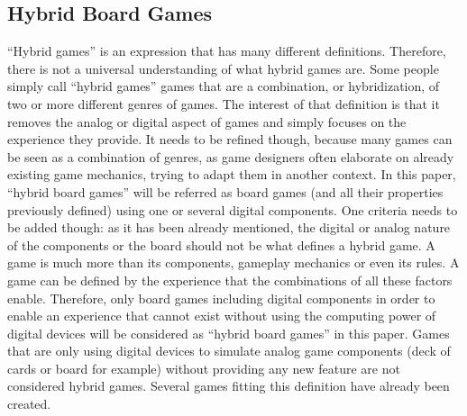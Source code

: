 \subsection{Hybrid Board Games}
“Hybrid games” is an expression that has many different definitions. Therefore, there is not a universal understanding of what hybrid games are. Some people simply call “hybrid games” games that are a combination, or hybridization, of two or more different genres of games. The interest of that definition is that it removes the analog or digital aspect of games and simply focuses on the experience they provide. It needs to be refined though, because many games can be seen as a combination of genres, as game designers often elaborate on already existing game mechanics, trying to adapt them in another context. In this paper, “hybrid board games” will be referred as board games (and all their properties previously defined) using one or several digital components. One criteria needs to be added though: as it has been already mentioned, the digital or analog nature of the components or the board should not be what defines a hybrid game. A game is much more than its components, gameplay mechanics or even its rules. A game can be defined by the experience that the combinations of all these factors enable. Therefore, only board games including digital components in order to enable an experience that cannot exist without using the computing power of digital devices will be considered as “hybrid board games” in this paper. Games that are only using digital devices to simulate analog game components (deck of cards or board for example) without providing any new feature are not considered hybrid games. Several games fitting this definition have already been created.



